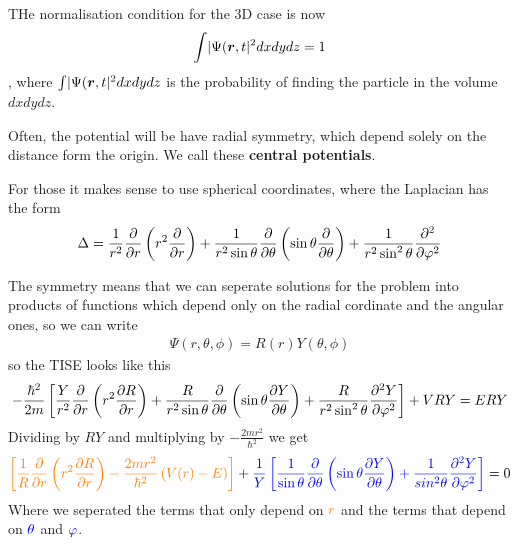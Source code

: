 THe normalisation condition for the 3D case is now
\begin{align*}
	\int \abs{\Psi(\bm{r},t}^2 dx dy dz = 1
\end{align*}
, where $\int \abs{\Psi(\bm{r},t}^2 dx dy dz$ is the probability of finding the particle in the volume $dxdydz$.


Often, the potential will be have radial symmetry, which depend solely on the distance form the origin. We call these \textbf{central potentials}.

For those it makes sense to use spherical coordinates, where the Laplacian has the form
\begin{align*}
		\Delta 
	= 
		\frac{1}{r^{2}} \frac{\del }{\del r} \left(
			r^{2} \frac{\del }{\del r}
		\right)
		+
		\frac{1}{r^{2}\sin \theta} \frac{\del }{\del \theta}\left(
			\sin \theta \frac{\del }{\del \theta}
		\right)
		+
		\frac{1}{r^{2} \sin^{2} \theta} \frac{\del^2}{\del \phi^2} 
\end{align*}

The symmetry means that we can seperate solutions for the problem into products of functions which depend only on the radial cordinate and the angular ones, so we can write
\begin{align*}
	\Psi(r,\theta,\phi) = R(r) Y(\theta,\phi)
\end{align*}
so the TISE looks like this
\begin{align*}
	-\frac{\hbar^{2}}{2m} \left[
		\frac{Y}{r^{2}} \frac{\del }{\del r}\left(r^{2} \frac{\del R}{\del r}\right)
		+
		\frac{R}{r^{2}\sin \theta} \frac{\del }{\del \theta} \left(
			\sin \theta \frac{\del Y}{\del \theta}
		\right)
		+
		\frac{R}{r^{2}\sin^{2}\theta} \frac{\del^2 Y}{\del \phi^2}
	\right]	+ VRY = ERY
\end{align*}
Dividing by $RY$ and multiplying by $- \frac{2m r^{2}}{\hbar^{2}}$ we get
\begin{align*}
	{\color{orange}\left[
			\frac{1}{R}\frac{\del }{\del r}\left(
				r^{2}\frac{\del R}{\del r}
			\right)
			-
			\frac{2mr^{2}}{\hbar^{2}} \left(
				V(r) - E
			\right)
	\right]}
	+
	{\color{blue}\frac{1}{Y}\left[
			\frac{1}{\sin \theta} \frac{\del }{\del \theta} \left(
				\sin \theta \frac{\del Y}{\del \theta}
			\right)
			+
			\frac{1}{sin^{2} \theta} \frac{\del^2 Y}{\del \phi^2}
	\right]} = 0
\end{align*}
Where we seperated the terms that only depend on ${\color{orange}r}$ and the terms that depend on ${\color{blue}\theta}$ and ${\color{blue}\phi}$.

